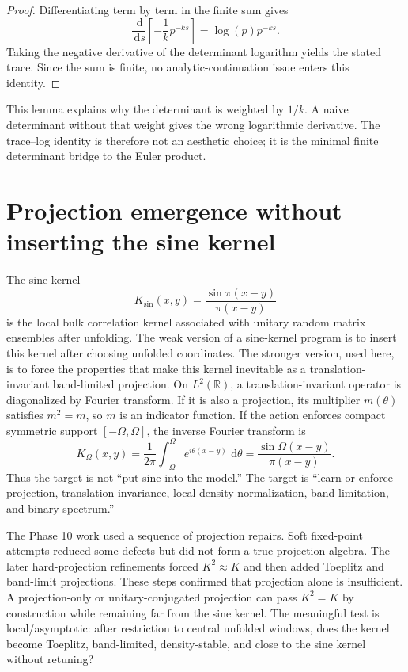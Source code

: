 \documentclass[11pt]{article}
\newcommand{\dd}{\,\mathrm{d}}
\theoremstyle{definition}
\theoremstyle{plain}
\begin{document}
\begin{proof}
Differentiating term by term in the finite sum gives
\begin{equation}
  \frac{\dd}{\dd s}\left[-\frac{1}{k}p^{-ks}\right]
  = \log(p) p^{-ks}.
\end{equation}
Taking the negative derivative of the determinant logarithm yields the stated trace.  Since the sum is finite, no analytic-continuation issue enters this identity.
\end{proof}

This lemma explains why the determinant is weighted by $1/k$.  A naive determinant without that weight gives the wrong logarithmic derivative.  The trace--log identity is therefore not an aesthetic choice; it is the minimal finite determinant bridge to the Euler product.

\section{Projection emergence without inserting the sine kernel}

The sine kernel
\begin{equation}
  K_{\sin}(x,y)=\frac{\sin\pi(x-y)}{\pi(x-y)}
\end{equation}
is the local bulk correlation kernel associated with unitary random matrix ensembles after unfolding.  The weak version of a sine-kernel program is to insert this kernel after choosing unfolded coordinates.  The stronger version, used here, is to force the properties that make this kernel inevitable as a translation-invariant band-limited projection.  On $L^2(\mathbb R)$, a translation-invariant operator is diagonalized by Fourier transform.  If it is also a projection, its multiplier $m(\theta)$ satisfies $m^2=m$, so $m$ is an indicator function.  If the action enforces compact symmetric support $[-\Omega,\Omega]$, the inverse Fourier transform is
\begin{equation}
  K_\Omega(x,y)=\frac{1}{2\pi}\int_{-\Omega}^{\Omega}e^{i\theta(x-y)}\,\dd\theta
  =\frac{\sin\Omega(x-y)}{\pi(x-y)}.
\end{equation}
Thus the target is not ``put sine into the model.''  The target is ``learn or enforce projection, translation invariance, local density normalization, band limitation, and binary spectrum.''

The Phase 10 work used a sequence of projection repairs.  Soft fixed-point attempts reduced some defects but did not form a true projection algebra.  The later hard-projection refinements forced $K^2\approx K$ and then added Toeplitz and band-limit projections.  These steps confirmed that projection alone is insufficient.  A projection-only or unitary-conjugated projection can pass $K^2=K$ by construction while remaining far from the sine kernel.  The meaningful test is local/asymptotic: after restriction to central unfolded windows, does the kernel become Toeplitz, band-limited, density-stable, and close to the sine kernel without retuning?
\end{document}
